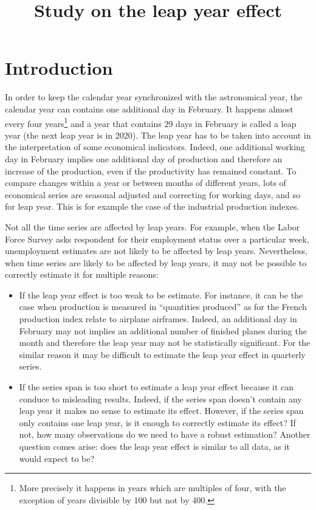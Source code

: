 \documentclass[]{article}
\title{Study on the leap year effect}
\author{}
\date{}
\providecommand{\tightlist}{%
  \setlength{\itemsep}{0pt}\setlength{\parskip}{0pt}}
\let\rmarkdownfootnote\footnote%
\def\footnote{\protect\rmarkdownfootnote}
\theoremstyle{definition}
\theoremstyle{definition}
\theoremstyle{definition}
\theoremstyle{remark}
\begin{document}
\maketitle

{
\setcounter{tocdepth}{2}
\tableofcontents
}
\section{Introduction}\label{introduction}

In order to keep the calendar year synchronized with the astronomical
year, the calendar year can contains one additional day in February. It
happens almost every four years\footnote{More precisely it happens in
  years which are multiples of four, with the exception of years
  divisible by 100 but not by 400.} and a year that contains 29 days in
February is called a leap year (the next leap year is in 2020). The leap
year has to be taken into account in the interpretation of some
economical indicators. Indeed, one additional working day in February
implies one additional day of production and therefore an increase of
the production, even if the productivity has remained constant. To
compare changes within a year or between months of different years, lots
of economical series are seasonal adjusted and correcting for working
days, and so for leap year. This is for example the case of the
industrial production indexes.

Not all the time series are affected by leap years. For example, when
the Labor Force Survey asks respondent for their employment status over
a particular week, unemployment estimates are not likely to be affected
by leap years. Nevertheless, when time series are likely to be affected
by leap years, it may not be possible to correctly estimate it for
multiple reasons:

\begin{itemize}
\tightlist
\item
  If the leap year effect is too weak to be estimate. For instance, it
  can be the case when production is measured in ``quantities produced''
  as for the French production index relate to airplane airframes.
  Indeed, an additional day in February may not implies an additional
  number of finished planes during the month and therefore the leap year
  may not be statistically significant. For the similar reason it may be
  difficult to estimate the leap year effect in quarterly series.\\
\item
  If the series span is too short to estimate a leap year effect because
  it can conduce to misleading results. Indeed, if the series span
  doesn't contain any leap year it makes no sense to estimate its
  effect. However, if the series span only contains one leap year, is it
  enough to correctly estimate its effect? If not, how many observations
  do we need to have a robust estimation? Another question comes arise:
  does the leap year effect is similar to all data, as it would expect
  to be?
\end{itemize}
\end{document}
